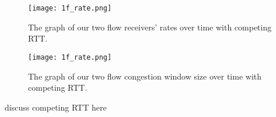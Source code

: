 \documentclass[11pt]{article}
\begin{document}
\begin{enumerate}
\begin{figure}[H]
\caption{The graph of our two flow receivers' rates over time with competing RTT.}
  \label{figure17}
    \centering
    \texttt{[image: 1f\_rate.png]}
\end{figure}

\begin{figure}[H]
\caption{The graph of our two flow congestion window size over time with competing RTT.}
  \label{figure18}
    \centering
    \texttt{[image: 1f\_rate.png]}
\end{figure}

discuss competing RTT here

\end{enumerate}
\end{document}

